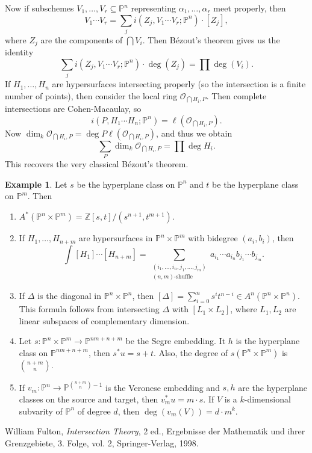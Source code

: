 \documentclass{amsart}
\theoremstyle{definition}
\newtheorem{exm}[thm]{Example}
\theoremstyle{remark}
\theoremstyle{plain}
\theoremstyle{definition}
\theoremstyle{remark}
\newcommand{\Z}{\mathbb{Z}}
\renewcommand{\P}{\mathbb{P}}
\newcommand{\msc}[1]{\mathscr{#1}}
\begin{document}
Now if subschemes $V_1, \ldots, V_r \subseteq \P^n$ representing $\alpha_1, \ldots, \alpha_r$ meet properly, then 
\[ V_1 \cdots V_r = \sum_j i(Z_j, V_1 \cdots V_r; \P^n) \cdot [Z_j], \]
where $Z_j$ are the components of $\bigcap V_i$. Then B\'ezout's theorem gives us the identity
\[ \sum_j i(Z_j, V_1 \cdots V_r; \P^n) \cdot \deg(Z_j) = \prod \deg(V_i). \]
If $H_1, \ldots, H_n$ are hypersurfaces intersecting properly (so the intersection is a finite number of points), then consider the local ring $\msc{O}_{\bigcap H_i,P}$. Then complete intersections are Cohen-Macaulay, so 
\[ i(P, H_1 \cdots H_n; \P^n) = \ell(\msc{O}_{\bigcap H_i, P}). \]
Now $\dim_k \msc{O}_{\bigcap H_i, P} = \deg P \ell(\msc{O}_{\bigcap H_i, P})$, and thus we obtain
\[ \sum_P \dim_k \msc{O}_{\bigcap H_i, P} = \prod \deg H_i. \]
This recovers the very classical B\'ezout's theorem.

\begin{exm}
    Let $s$ be the hyperplane class on $\P^n$ and $t$ be the hyperplane class on $\P^m$. Then 
    \begin{enumerate}
        \item $A^*(\P^n \times \P^m) = \Z[s,t]/(s^{n+1}, t^{m+1})$.
        \item If $H_1, \ldots, H_{n+m}$ are hypersurfaces in $\P^n \times \P^m$ with bidegree $(a_i, b_i)$, then
            \[ \int [H_1] \cdots [H_{n+m}] = \sum_{ \substack{(i_1, \ldots, i_n, j_1, \ldots, j_m) \\ (n,m)\text{-shuffle}} } a_{i_1} \cdots a_{i_n} b_{j_1} \cdots b_{j_m}. \]
        \item If $\Delta$ is the diagonal in $\P^n \times \P^n$, then $[\Delta] = \sum_{i=0}^n s^i t^{n-i} \in A^n(\P^n \times \P^n)$. 
            This formula follows from intersecting $\Delta$ with $[L_1 \times L_2]$, where $L_1, L_2$ are linear subspaces of complementary dimension.
        \item Let $s \colon \P^n \times \P^m \to \P^{nm+n+m}$ be the Segre embedding. It $h$ is the hyperplane class on $\P^{nm+n+m}$, then $s^* u = s + t$. Also, the degree of $s(\P^n \times \P^m)$ is $\binom{n+m}{n}$.
        \item If $v_m \colon \P^n \to \P^{\binom{n+m}{n}-1}$ is the Veronese embedding and $s,h$ are the hyperplane classes on the source and target, then $v_m^* u = m \cdot s$. If $V$ is a $k$-dimensional subvarity of $\P^n$ of degree $d$, then $\deg(v_m(V)) = d \cdot m^k$.
    \end{enumerate}
\end{exm}




\begin{thebibliography}{9}
     William Fulton, \textit{Intersection Theory}, 2 ed., Ergebnisse der Mathematik und ihrer Grenzgebiete, 3. Folge, vol. 2, Springer-Verlag, 1998. 
\end{thebibliography}
\end{document}
